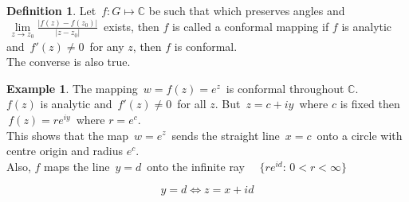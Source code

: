 \documentclass[11pt,a4paper]{article}
\theoremstyle{definition}
\newtheorem{definition}[thm]{Definition}
\newtheorem{example}[thm]{Example}
\begin{document}
\begin{definition}
Let $\, f: G \longmapsto \mathbb{C}$ be such that which preserves angles and $\, \lim\limits_{z \rightarrow z_0} \frac{\left|f(z) - f(z_0)\right|
}{\left|z - z_0\right|
}\,$ exists, then $f$ is called a conformal mapping if $f$ is analytic and $\, f'(z) \neq 0\,$ for any $z$, then $f$ is conformal.\\


The converse is also true.
\end{definition}

\begin{example}
The mapping $\, w = f(z) = e^z\,$ is conformal throughout $\mathbb{C}$.\\

$f(z)$ is analytic and $\, f'(z) \neq 0\,$ for all $z$. But $\, z = c + iy\,$ where $c$ is fixed then $\, f(z) = re^{iy}\,$ where $r = e^c$.\\

This shows that the map $\, w = e^z\,$ sends the straight line $\, x = c\,$ onto a circle with centre origin and radius $e^c$.\\

Also, $f$ maps the line $\, y = d\,$ onto the infinite ray $\quad \{re^{id}:\, 0 < r< \infty\}$

$$y = d\iff z = x + id$$
\end{example}
\end{document}
